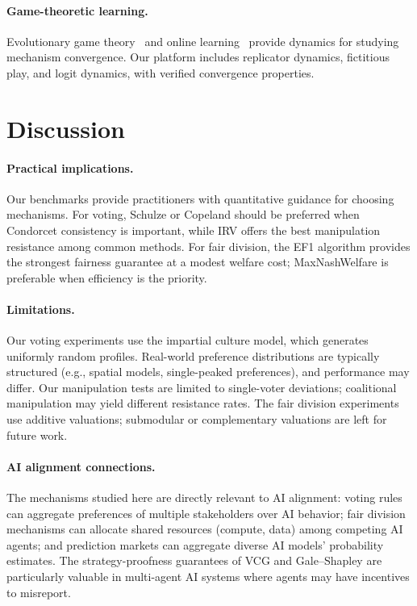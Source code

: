 \documentclass[10pt]{article}
\begin{document}
\paragraph{Game-theoretic learning.}
Evolutionary game theory~\citep{weibull1997evolutionary, sandholm2010population} and online learning~\citep{cesa2006prediction} provide dynamics for studying mechanism convergence. Our platform includes replicator dynamics, fictitious play, and logit dynamics, with verified convergence properties.

\section{Discussion}

\paragraph{Practical implications.}
Our benchmarks provide practitioners with quantitative guidance for choosing mechanisms. For voting, Schulze or Copeland should be preferred when Condorcet consistency is important, while IRV offers the best manipulation resistance among common methods. For fair division, the EF1 algorithm provides the strongest fairness guarantee at a modest welfare cost; MaxNashWelfare is preferable when efficiency is the priority.

\paragraph{Limitations.}
Our voting experiments use the impartial culture model, which generates uniformly random profiles. Real-world preference distributions are typically structured (e.g., spatial models, single-peaked preferences), and performance may differ. Our manipulation tests are limited to single-voter deviations; coalitional manipulation may yield different resistance rates. The fair division experiments use additive valuations; submodular or complementary valuations are left for future work.

\paragraph{AI alignment connections.}
The mechanisms studied here are directly relevant to AI alignment: voting rules can aggregate preferences of multiple stakeholders over AI behavior; fair division mechanisms can allocate shared resources (compute, data) among competing AI agents; and prediction markets can aggregate diverse AI models' probability estimates. The strategy-proofness guarantees of VCG and Gale--Shapley are particularly valuable in multi-agent AI systems where agents may have incentives to misreport.
\end{document}
